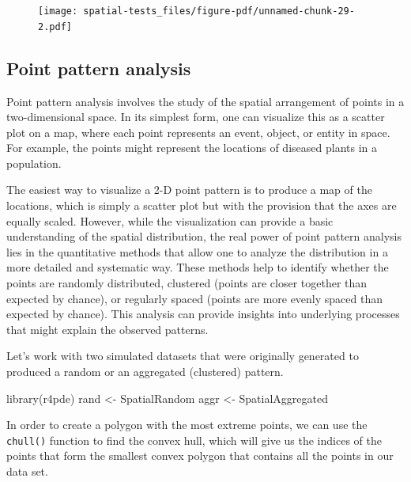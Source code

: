 \documentclass[
  letterpaper,
]{book}
\newenvironment{Shaded}{\begin{snugshade}}{\end{snugshade}}
\newcommand{\FunctionTok}[1]{\textcolor[rgb]{0.28,0.35,0.67}{#1}}
\newcommand{\NormalTok}[1]{\textcolor[rgb]{0.00,0.23,0.31}{#1}}
\newcommand{\OtherTok}[1]{\textcolor[rgb]{0.00,0.23,0.31}{#1}}
\begin{document}
\begin{figure}[H]

\texttt{[image: spatial-tests\_files/figure-pdf/unnamed-chunk-29-2.pdf]} \hfill{}

\end{figure}

\hypertarget{point-pattern-analysis}{%
\subsection{Point pattern analysis}\label{point-pattern-analysis}}

Point pattern analysis involves the study of the spatial arrangement of
points in a two-dimensional space. In its simplest form, one can
visualize this as a scatter plot on a map, where each point represents
an event, object, or entity in space. For example, the points might
represent the locations of diseased plants in a population.

The easiest way to visualize a 2-D point pattern is to produce a map of
the locations, which is simply a scatter plot but with the provision
that the axes are equally scaled. However, while the visualization can
provide a basic understanding of the spatial distribution, the real
power of point pattern analysis lies in the quantitative methods that
allow one to analyze the distribution in a more detailed and systematic
way. These methods help to identify whether the points are randomly
distributed, clustered (points are closer together than expected by
chance), or regularly spaced (points are more evenly spaced than
expected by chance). This analysis can provide insights into underlying
processes that might explain the observed patterns.

Let's work with two simulated datasets that were originally generated to
produced a random or an aggregated (clustered) pattern.

\begin{Shaded}
\begin{Highlighting}[]
\FunctionTok{library}\NormalTok{(r4pde)}
\NormalTok{rand }\OtherTok{\textless{}{-}}\NormalTok{ SpatialRandom}
\NormalTok{aggr }\OtherTok{\textless{}{-}}\NormalTok{ SpatialAggregated}
\end{Highlighting}
\end{Shaded}

In order to create a polygon with the most extreme points, we can use
the \texttt{chull()} function to find the convex hull, which will give
us the indices of the points that form the smallest convex polygon that
contains all the points in our data set.
\end{document}
